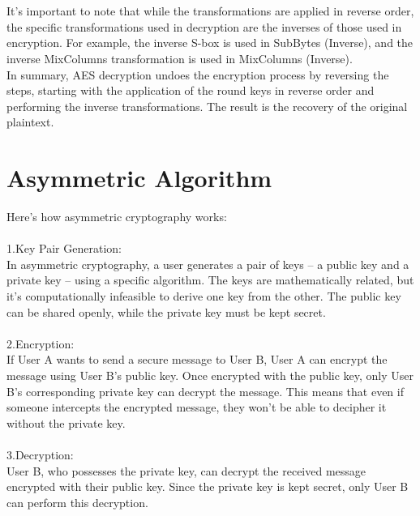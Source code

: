 \documentclass{report}
\begin{document}
\\
\\
It's important to note that while the transformations are applied in reverse order, the specific transformations used in decryption are the inverses of those used in encryption. For example, the inverse S-box is used in SubBytes (Inverse), and the inverse MixColumns transformation is used in MixColumns (Inverse).\\
In summary, AES decryption undoes the encryption process by reversing the steps, starting with the application of the round keys in reverse order and performing the inverse transformations. The result is the recovery of the original plaintext.


\chapter{Asymmetric Algorithm}
\pagebreak
{}
Here's how asymmetric cryptography works:\\
\\
1.Key Pair Generation:\\
In asymmetric cryptography, a user generates a pair of keys – a public key and a private key – using a specific algorithm. The keys are mathematically related, but it's computationally infeasible to derive one key from the other. The public key can be shared openly, while the private key must be kept secret.\\
\\
2.Encryption:\\
If User A wants to send a secure message to User B, User A can encrypt the message using User B's public key. Once encrypted with the public key, only User B's corresponding private key can decrypt the message. This means that even if someone intercepts the encrypted message, they won't be able to decipher it without the private key.\\
\\
3.Decryption:\\
User B, who possesses the private key, can decrypt the received message encrypted with their public key. Since the private key is kept secret, only User B can perform this decryption.\\
\end{document}
